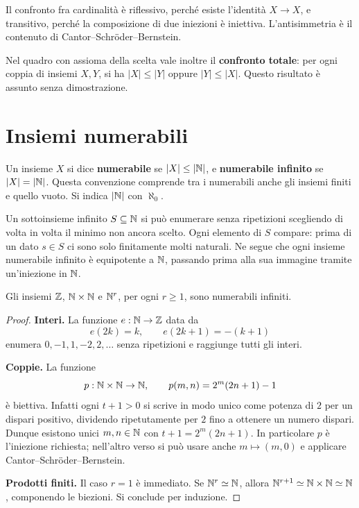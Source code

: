 \begin{osservazione}
Il confronto fra cardinalità è riflessivo, perché esiste l'identità $X\to X$, e transitivo, perché la composizione di due iniezioni è iniettiva. L'antisimmetria è il contenuto di Cantor--Schröder--Bernstein.

Nel quadro con assioma della scelta vale inoltre il \textbf{confronto totale}: per ogni coppia di insiemi $X,Y$, si ha $|X|\le|Y|$ oppure $|Y|\le|X|$. Questo risultato è assunto senza dimostrazione.
\end{osservazione}

\section{Insiemi numerabili}
\begin{definizione}
Un insieme $X$ si dice \textbf{numerabile} se $|X|\le|\mathbb{N}|$, e \textbf{numerabile infinito} se $|X|=|\mathbb{N}|$. Questa convenzione comprende tra i numerabili anche gli insiemi finiti e quello vuoto. Si indica $|\mathbb{N}|$ con $\aleph_0$.
\end{definizione}

Un sottoinsieme infinito $S\subseteq\mathbb{N}$ si può enumerare senza ripetizioni scegliendo di volta in volta il minimo non ancora scelto. Ogni elemento di $S$ compare: prima di un dato $s\in S$ ci sono solo finitamente molti naturali. Ne segue che ogni insieme numerabile infinito è equipotente a $\mathbb{N}$, passando prima alla sua immagine tramite un'iniezione in $\mathbb{N}$.

\begin{proposizione}
Gli insiemi $\mathbb{Z}$, $\mathbb{N}\times\mathbb{N}$ e $\mathbb{N}^r$, per ogni $r\ge1$, sono numerabili infiniti.
\end{proposizione}
\begin{proof}
\textbf{Interi.} La funzione $e:\mathbb{N}\to\mathbb{Z}$ data da
\[
e(2k)=k,\qquad e(2k+1)=-(k+1)
\]
enumera $0,-1,1,-2,2,\ldots$ senza ripetizioni e raggiunge tutti gli interi.

\textbf{Coppie.} La funzione
\[
p:\mathbb{N}\times\mathbb{N}\to\mathbb{N},\qquad p(m,n)=2^m(2n+1)-1
\]
è biettiva. Infatti ogni $t+1>0$ si scrive in modo unico come potenza di $2$ per un dispari positivo, dividendo ripetutamente per $2$ fino a ottenere un numero dispari. Dunque esistono unici $m,n\in\mathbb{N}$ con $t+1=2^m(2n+1)$. In particolare $p$ è l'iniezione richiesta; nell'altro verso si può usare anche $m\mapsto(m,0)$ e applicare Cantor--Schröder--Bernstein.

\textbf{Prodotti finiti.} Il caso $r=1$ è immediato. Se $\mathbb{N}^r\simeq\mathbb{N}$, allora $\mathbb{N}^{r+1}\simeq\mathbb{N}\times\mathbb{N}\simeq\mathbb{N}$, componendo le biezioni. Si conclude per induzione.
\end{proof}

